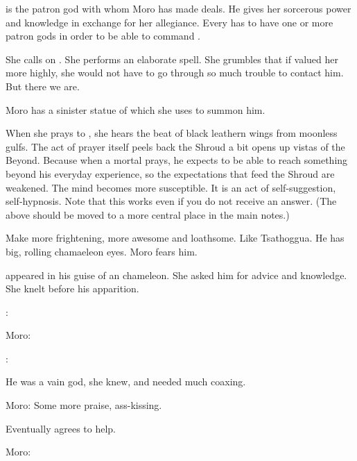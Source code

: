
\Nasshikerr is the patron god with whom Moro has made deals.
He gives her sorcerous power and knowledge in exchange for her allegiance. 
Every \rethyax has to have one or more patron gods in order to be able to command \daemons.

She calls on \Nasshikerr. 
She performs an elaborate spell.
She grumbles that if \Nasshikerr valued her more highly, she would not have to go through so much trouble to contact him. 
But there we are. 

Moro has a sinister statue of \Nasshikerr which she uses to summon him.

When she prays to \Nasshikerr, she hears the beat of black leathern wings from moonless gulfs. 
The act of prayer itself peels back the Shroud a bit opens up vistas of the Beyond. 
Because when a mortal prays, he expects to be able to reach something beyond his everyday experience, so the expectations that feed the Shroud are weakened. 
The mind becomes more susceptible. 
It is an act of self-suggestion, self-hypnosis. 
Note that this works even if you do not receive an answer. 
(The above should be moved to a more central place in the main notes.)

Make \Nasshikerr more frightening, more awesome and loathsome.
Like Tsathoggua.
He has big, rolling chamaeleon eyes. 
Moro fears him.

\Nasshikerr appeared in his guise of an chameleon.  
She asked him for advice and knowledge. 
She knelt before his apparition. 

\Nasshikerr:

Moro:

\Nasshikerr:

He was a vain god, she knew, and needed much coaxing. 

Moro:
Some more praise, ass-kissing. 

Eventually \Nasshikerr{} agrees to help. 

Moro:

